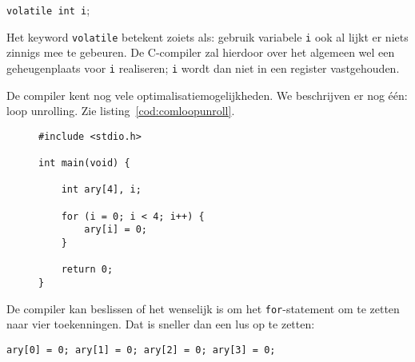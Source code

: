 \newpage
\hspace*{1em}\texttt{volatile int i};

Het keyword \texttt{volatile} betekent zoiets als: gebruik variabele \texttt{i} ook al lijkt er niets zinnigs mee te gebeuren. De C-compiler zal hierdoor over het algemeen wel een geheugenplaats voor \texttt{i} realiseren; \texttt{i} wordt dan niet in een register vastgehouden.

De compiler kent nog vele optimalisatiemogelijkheden. We beschrijven er nog één: loop unrolling. Zie listing~\ref{cod:comloopunroll}.

\begin{figure}[!ht]
\begin{lstlisting}[caption=Een C-programma.,label=cod:comloopunroll]
#include <stdio.h>

int main(void) {

    int ary[4], i;
    
    for (i = 0; i < 4; i++) {
        ary[i] = 0;
    }
    
    return 0;
}
\end{lstlisting}
\end{figure}

De compiler kan beslissen of het wenselijk is om het \texttt{for}-statement om te zetten naar vier toekenningen. Dat is sneller dan een lus op te zetten:

\hspace*{1em}\texttt{ary[0] = 0; ary[1] = 0; ary[2] = 0; ary[3] = 0;}

